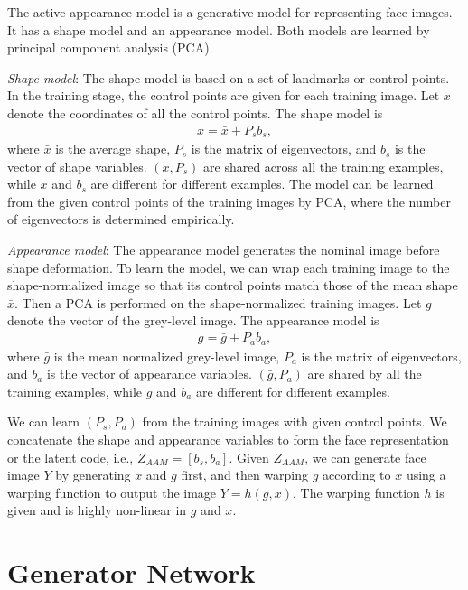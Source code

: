 \documentclass{article}
\begin{document}
The active appearance model \cite{cootes2001active,cootes2015active} is a generative model for representing face images. It has a shape model and an appearance model. Both models are learned by principal component analysis (PCA).

\textit{Shape model}: The shape model is based on a set of landmarks or control points. In the training stage, the control points are given for each training image.  Let $x$ denote the coordinates of all the control points. The shape model is
\begin{eqnarray}
\label{eqn1}
x = \bar{x} + P_s b_s,
\end{eqnarray}
where $\bar{x}$ is the average shape, $P_s$ is the matrix of eigenvectors, and $b_s$ is the vector of shape variables. $(\bar{x}, P_s)$ are shared across all the training examples, while $x$ and $b_s$ are different for different examples. The model can be learned from the given control points of the training images by PCA, where the number of eigenvectors is determined empirically.

\textit{Appearance model}: The appearance model generates the nominal image before shape deformation. To learn the model, we can wrap each training image to the shape-normalized image so that its control points match those of the mean shape $\bar{x}$. Then a PCA is performed on the shape-normalized training images.  Let $g$ denote the vector of the grey-level image. The appearance model is
\begin{eqnarray}
\label{eqn2}
g = \bar{g} + P_a b_a,
\end{eqnarray}
where $\bar{g}$ is the mean normalized grey-level image, $P_a$ is the matrix of eigenvectors,  and $b_a$ is the vector of appearance variables. $(\bar{g}, P_a)$ are shared by all the training examples, while $g$ and $b_a$ are different for different examples.

We can learn $(P_s, P_a)$ from the training images with given control points. We concatenate the shape and appearance variables to form the face representation or the latent code, i.e., $Z_{AAM} = [b_s, b_a]$. Given $Z_{AAM}$, we can generate face image $Y$ by generating $x$ and $g$ first, and then warping $g$ according to $x$ using a warping function to output the image $Y = h(g, x)$. The warping function $h$ is given and is highly non-linear in $g$ and $x$.


\section{Generator Network} \label{sec:VAE} %
\end{document}
